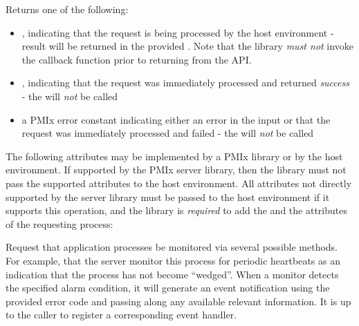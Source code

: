 Returns one of the following:

\begin{itemize}
    \item {}, indicating that the request is being processed by the host environment - result will be returned in the provided . Note that the library \emph{must not} invoke the callback function prior to returning from the \ac{API}.
    \item {}, indicating that the request was immediately processed and returned \textit{success} - the  will \textit{not} be called
    \item a PMIx error constant indicating either an error in the input or that the request was immediately processed and failed - the  will \textit{not} be called
\end{itemize}

\optattrstart
The following attributes may be implemented by a \ac{PMIx} library or by the host environment. If supported by the \ac{PMIx} server library, then the library must not pass the supported attributes to the host environment. All attributes not directly supported by the server library must be passed to the host environment if it supports this operation, and the library is \textit{required} to add the  and the  attributes of the requesting process:


\optattrend

\descr

Request that application processes be monitored via several possible methods.
For example, that the server monitor this process for periodic heartbeats as an indication that the process has not become ``wedged''.
When a monitor detects the specified alarm condition, it will generate an event notification using the provided error code and passing along any available relevant information.
It is up to the caller to register a corresponding event handler.

